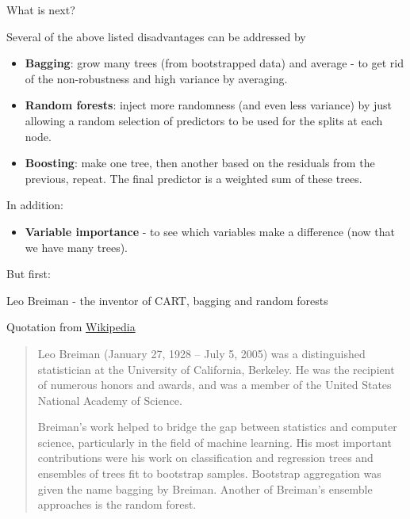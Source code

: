 \documentclass[10pt,ignorenonframetext,]{beamer}
\providecommand{\tightlist}{%
  \setlength{\itemsep}{0pt}\setlength{\parskip}{0pt}}
\begin{document}
\begin{frame}

\begin{block}{What is next?}

\vspace{2mm}

Several of the above listed disadvantages can be addressed by

\begin{itemize}
\item
  \textbf{Bagging}: grow many trees (from bootstrapped data) and average
  - to get rid of the non-robustness and high variance by averaging.
\item
  \textbf{Random forests}: inject more randomness (and even less
  variance) by just allowing a random selection of predictors to be used
  for the splits at each node.
\item
  \textbf{Boosting}: make one tree, then another based on the residuals
  from the previous, repeat. The final predictor is a weighted sum of
  these trees.
\end{itemize}

\vspace{1mm}

In addition:

\begin{itemize}
\tightlist
\item
  \textbf{Variable importance} - to see which variables make a
  difference (now that we have many trees).
\end{itemize}

\end{block}

\end{frame}

\begin{frame}

But first:

\begin{block}{Leo Breiman - the inventor of CART, bagging and random
forests}

\vspace{1mm} Quotation from
\href{https://en.wikipedia.org/wiki/Leo_Breiman}{Wikipedia} \vspace{1mm}

\begin{quote}
Leo Breiman (January 27, 1928 – July 5, 2005) was a distinguished statistician at the University of California, Berkeley. He was the recipient of numerous honors and awards, and was a member of the United States National Academy of Science.

Breiman's work helped to bridge the gap between statistics and computer science, particularly in the field of machine learning. His most important contributions were his work on classification and regression trees and ensembles of trees fit to bootstrap samples. Bootstrap aggregation was given the name bagging by Breiman. Another of Breiman's ensemble approaches is the random forest.
\end{quote}

\end{block}

\end{frame}
\end{document}
